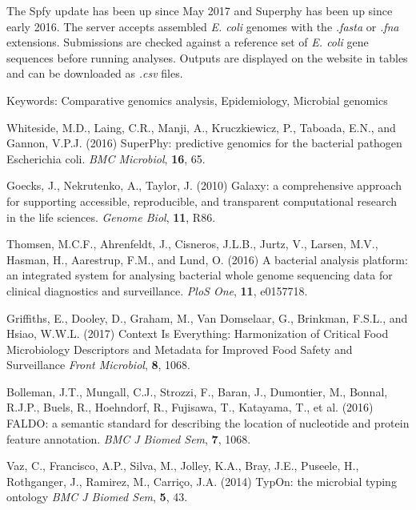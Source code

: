 \documentclass[a4,center,fleqn]{NAR}
\begin{document}
The Spfy update has been up since May 2017 and Superphy has been up since early 2016. The server accepts assembled \textit{E. coli} genomes with the \textit{.fasta} or \textit{.fna} extensions. Submissions are checked against a reference set of \textit{E. coli} gene sequences before running analyses. Outputs are displayed on the website in tables and can be downloaded as \textit{.csv} files. 
\par

Keywords: Comparative genomics analysis, Epidemiology, Microbial genomics

\newpage

\begin{thebibliography}{4}

Whiteside, M.D., Laing, C.R., Manji, A., Kruczkiewicz, P., Taboada, E.N., and Gannon, V.P.J. (2016)
SuperPhy: predictive genomics for the bacterial pathogen Escherichia coli.
\textit{BMC Microbiol}, \textbf{16}, 65.

Goecks, J., Nekrutenko, A., Taylor, J. (2010)
Galaxy: a comprehensive approach for supporting accessible, reproducible, and transparent computational research in the life sciences.
\textit{Genome Biol}, \textbf{11}, R86.

Thomsen, M.C.F., Ahrenfeldt, J., Cisneros, J.L.B., Jurtz, V., Larsen, M.V., Hasman, H., Aarestrup, F.M., and Lund, O. (2016)
A bacterial analysis platform: an integrated system for analysing bacterial whole genome sequencing data for clinical diagnostics and surveillance.
\textit{PloS One}, \textbf{11}, e0157718.

Griffiths, E., Dooley, D., Graham, M., Van Domselaar, G., Brinkman, F.S.L., and Hsiao, W.W.L. (2017)
Context Is Everything: Harmonization of Critical Food Microbiology Descriptors and Metadata for Improved Food Safety and Surveillance
\textit{Front Microbiol}, \textbf{8}, 1068.

Bolleman, J.T., Mungall, C.J., Strozzi, F., Baran, J., Dumontier, M., Bonnal, R.J.P., Buels, R., Hoehndorf, R., Fujisawa, T., Katayama, T., et al. (2016)
FALDO: a semantic standard for describing the location of nucleotide and protein feature annotation.
\textit{BMC J Biomed Sem}, \textbf{7}, 1068.

Vaz, C., Francisco, A.P., Silva, M., Jolley, K.A., Bray, J.E., Puseele, H., Rothganger, J., Ramirez, M., Carri\c{c}o, J.A. (2014)
TypOn: the microbial typing ontology
\textit{BMC J Biomed Sem}, \textbf{5}, 43.

\end{thebibliography}
\end{document}
